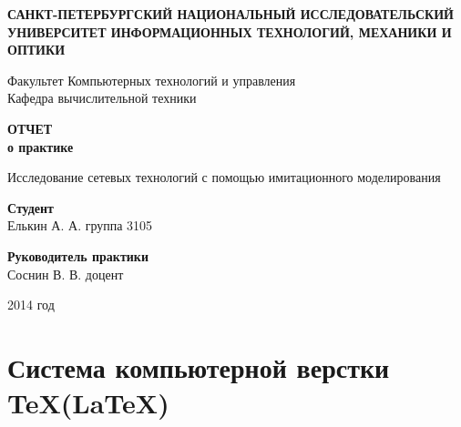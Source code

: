 \documentclass[14pt,a4paper]{article}
\begin{document}
\renewcommand\refname{Литература}
\thispagestyle{empty}

\begin{center}
\textbf{САНКТ-ПЕТЕРБУРГСКИЙ НАЦИОНАЛЬНЫЙ ИССЛЕДОВАТЕЛЬСКИЙ УНИВЕРСИТЕТ ИНФОРМАЦИОННЫХ ТЕХНОЛОГИЙ, 
МЕХАНИКИ И ОПТИКИ}

Факультет Компьютерных технологий и управления\\
Кафедра вычислительной техники
\end{center}
\vspace{2.5cm}

\begin{center}
\textbf{ОТЧЕТ}
\\
\textbf{о практике}

Исследование сетевых технологий с помощью имитационного моделирования
\end{center}

\vspace{2.5cm}

\begin{flushright}
\textbf{Студент}\\
Елькин А. А. группа 3105

\textbf{Руководитель практики}\\
Соснин В. В. доцент
\end{flushright}
\vspace{6cm}
\begin{center}
2014 год
\end{center}
\newpage
\tableofcontents
\newpage
\section{Система компьютерной верстки \TeX(\LaTeX)}
\end{document}
